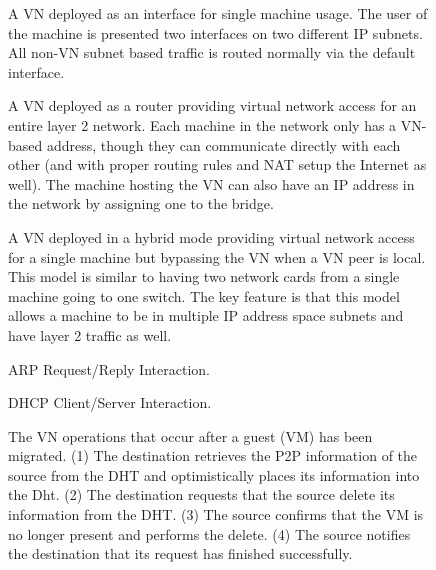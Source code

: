 \begin{figure}[ht]
\centering
{}
\caption[VN Interface]{A VN deployed as an interface for single machine usage.
The user of the machine is presented two interfaces on two different IP subnets.
All non-VN subnet based traffic is routed normally via the default interface.}
\label{fig:interface}
\end{figure}

\begin{figure}[ht]
\centering
{}
\caption[VN Router]{A VN deployed as a router providing virtual network access
for an entire layer 2 network.  Each machine in the network only has a VN-based
address, though they can communicate directly with each other (and with proper
routing rules and NAT setup the Internet as well).  The machine hosting the VN
can also have an IP address in the network by assigning one to the bridge.}
\label{fig:router}
\end{figure}

\begin{figure}[ht]
\centering
{}
\caption[VN Hybrid]{A VN deployed in a hybrid mode providing virtual network
access for a single machine but bypassing the VN when a VN peer is local.  This
model is similar to having two network cards from a single machine going to one
switch.  The key feature is that this model allows a machine to be in multiple
IP address space subnets and have layer 2 traffic as well.}
\label{fig:hybrid}
\end{figure}

\begin{figure}[ht]
\centering
{}
\caption{ARP Request/Reply Interaction.}
\label{fig:arp}
\end{figure}

\begin{figure}[ht]
\centering
{}
\caption{DHCP Client/Server Interaction.}
\label{fig:dhcp}
\end{figure}

\begin{figure}[ht]
\centering
{}
\caption[VN Router Migration]{The VN operations that occur after a guest (VM)
has been migrated.  (1) The destination retrieves the P2P information of the
source from the DHT and optimistically places its information into the Dht.
(2) The destination requests that the source delete its information from the
DHT.  (3)  The source confirms that the VM is no longer present and performs
the delete.  (4)  The source notifies the destination that its request has
finished successfully.}
\label{fig:migration_ring}
\end{figure}

